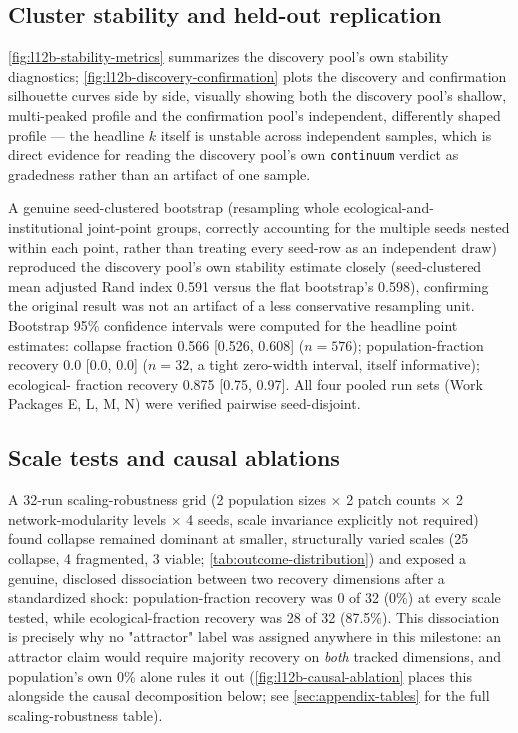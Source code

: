 \subsection{Cluster stability and held-out replication}
\label{sec:level12b-stability}

\cref{fig:l12b-stability-metrics} summarizes the discovery pool's own
stability diagnostics; \cref{fig:l12b-discovery-confirmation} plots the
discovery and confirmation silhouette curves side by side, visually
showing both the discovery pool's shallow, multi-peaked profile and the
confirmation pool's independent, differently shaped profile --- the
headline $k$ itself is unstable across independent samples, which is
direct evidence for reading the discovery pool's own \texttt{continuum}
verdict as gradedness rather than an artifact of one sample.

A genuine seed-clustered bootstrap (resampling whole ecological-and-
institutional joint-point groups, correctly accounting for the multiple
seeds nested within each point, rather than treating every seed-row as an
independent draw) reproduced the discovery pool's own stability estimate
closely (seed-clustered mean adjusted Rand index 0.591 versus the flat
bootstrap's 0.598), confirming the original result was not an artifact of
a less conservative resampling unit. Bootstrap 95\% confidence intervals
were computed for the headline point estimates: collapse fraction 0.566
[0.526, 0.608] ($n=576$); population-fraction recovery 0.0 [0.0, 0.0]
($n=32$, a tight zero-width interval, itself informative); ecological-
fraction recovery 0.875 [0.75, 0.97]. All four pooled run sets (Work
Packages E, L, M, N) were verified pairwise seed-disjoint.

\subsection{Scale tests and causal ablations}
\label{sec:level12b-scale-causal}

A 32-run scaling-robustness grid (2 population sizes $\times$ 2 patch
counts $\times$ 2 network-modularity levels $\times$ 4 seeds, scale
invariance explicitly not required) found collapse remained dominant at
smaller, structurally varied scales (25 collapse, 4 fragmented, 3 viable;
\cref{tab:outcome-distribution}) and exposed a genuine, disclosed
dissociation between two recovery dimensions after a standardized shock:
population-fraction recovery was 0 of 32 (0\%) at every scale tested,
while ecological-fraction recovery was 28 of 32 (87.5\%). This
dissociation is precisely why no "attractor" label was assigned anywhere
in this milestone: an attractor claim would require majority recovery on
\textit{both} tracked dimensions, and population's own 0\% alone rules it
out (\cref{fig:l12b-causal-ablation} places this alongside the causal
decomposition below; see \cref{sec:appendix-tables} for the full
scaling-robustness table).


